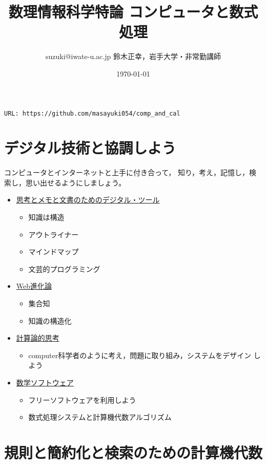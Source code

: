 \documentclass[dvipdfmx,11pat]{jarticle}
\author{suzuki@iwate-u.ac.jp 鈴木正幸，岩手大学・非常勤講師}
\date{\today}
\title{数理情報科学特論 コンピュータと数式処理}
\begin{document}
\maketitle

\begin{center}
\large{\tt URL: https://github.com/masayuki054/comp\_and\_cal}
\end{center}

\section{デジタル技術と協調しよう}
\label{sec:orgf2ba7a1}

コンピュータとインターネットと上手に付き合って，
知り，考え，記憶し，検索し，思い出せるようにしましょう。

\begin{itemize}
\item \href{./org/digital\_tools.org}{思考とメモと文書のためのデジタル・ツール}
\begin{itemize}
\item 知識は構造
\item アウトライナー
\item マインドマップ
\item 文芸的プログラミング
\end{itemize}

\item \href{./org/web.org}{Web進化論}
\begin{itemize}
\item 集合知
\item 知識の構造化
\end{itemize}

\item \href{./org/comp\_thinking.org}{計算論的思考}
\begin{itemize}
\item computer科学者のように考え，問題に取り組み，システムをデザイン
しよう
\end{itemize}

\item \href{./org/math-soft.org}{数学ソフトウェア}
\begin{itemize}
\item フリーソフトウェアを利用しよう
\item 数式処理システムと計算機代数アルゴリズム
\end{itemize}
\end{itemize}

\section{規則と簡約化と検索のための計算機代数}
\label{sec:org8968eb6}
\end{document}
